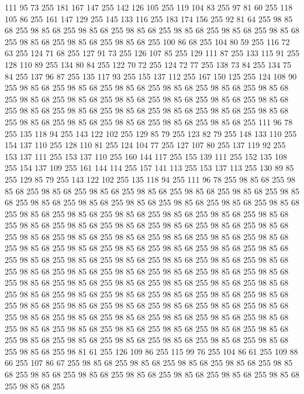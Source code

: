 111 95 73 255 181 167 147 255 142 126 105 255 119 104 83 255 97 81 60 255 118 105 86 255 161 147 129 255 145 133 116 255 183 174 156 255 92 81 64 255 98 85 68 255 98 85 68 255 98 85 68 255 98 85 68 255 98 85 68 255 98 85 68 255 98 85 68 255 98 85 68 255 98 85 68 255 98 85 68 255 100 86 68 255 104 80 59 255 116 72 63 255 124 71 68 255 127 91 73 255 126 107 85 255 129 111 87 255 133 115 91 255 128 110 89 255 134 80 84 255 122 70 72 255 124 72 77 255 138 73 84 255 134 75 84 255 137 96 87 255 135 117 93 255 155 137 112 255 167 150 125 255 124 108 90 255 98 85 68 255 98 85 68 255 98 85 68 255 98 85 68 255 98 85 68 255 98 85 68 255 98 85 68 255 98 85 68 255 98 85 68 255 98 85 68 255 98 85 68 255 98 85 68 255 98 85 68 255 98 85 68 255 98 85 68 255 98 85 68 255 98 85 68 255 98 85 68 255 98 85 68 255 98 85 68 255 98 85 68 255 98 85 68 255 98 85 68 255 111 96 78 255 135 118 94 255
143 122 102 255 129 85 79 255 123 82 79 255 148 133 110 255 154 137 110 255 128 110 81 255 124 104 77 255 127 107 80 255 137 119 92 255 153 137 111 255 153 137 110 255 160 144 117 255 155 139 111 255 152 135 108 255 154 137 109 255 161 144 114 255 157 141 113 255 153 137 113 255 130 89 85 255 129 85 79 255 143 122 102 255 135 118 94 255 111 96 78 255 98 85 68 255 98 85 68 255 98 85 68 255 98 85 68 255 98 85 68 255 98 85 68 255 98 85 68 255 98 85 68 255 98 85 68 255 98 85 68 255 98 85 68 255 98 85 68 255 98 85 68 255 98 85 68 255 98 85 68 255 98 85 68 255 98 85 68 255 98 85 68 255 98 85 68 255 98 85 68 255 98 85 68 255 98 85 68 255 98 85 68 255 98 85 68 255 98 85 68 255 98 85 68 255 98 85 68 255 98 85 68 255 98 85 68 255 98 85 68 255 98 85 68 255 98 85 68 255 98 85 68 255 98 85 68 255 98 85 68 255 98 85 68 255 98 85 68 255 98 85 68 255 98 85 68 255 98 85 68 255 98 85 68 255
98 85 68 255 98 85 68 255 98 85 68 255 98 85 68 255 98 85 68 255 98 85 68 255 98 85 68 255 98 85 68 255 98 85 68 255 98 85 68 255 98 85 68 255 98 85 68 255 98 85 68 255 98 85 68 255 98 85 68 255 98 85 68 255 98 85 68 255 98 85 68 255 98 85 68 255 98 85 68 255 98 85 68 255 98 85 68 255 98 85 68 255 98 85 68 255 98 85 68 255 98 85 68 255 98 85 68 255 98 85 68 255 98 85 68 255 98 85 68 255 98 85 68 255 98 85 68 255 98 85 68 255 98 85 68 255 98 85 68 255 98 85 68 255 98 85 68 255 98 85 68 255 98 85 68 255 98 85 68 255 98 85 68 255 98 85 68 255 98 85 68 255 98 85 68 255 98 85 68 255 98 85 68 255 98 81 61 255 126 109 86 255 115 99 76 255 104 86 61 255 109 88 66 255 107 86 67 255 98 85 68 255 98 85 68 255 98 85 68 255 98 85 68 255 98 85 68 255 98 85 68 255 98 85 68 255 98 85 68 255 98 85 68 255 98 85 68 255 98 85 68 255 98 85 68 255
